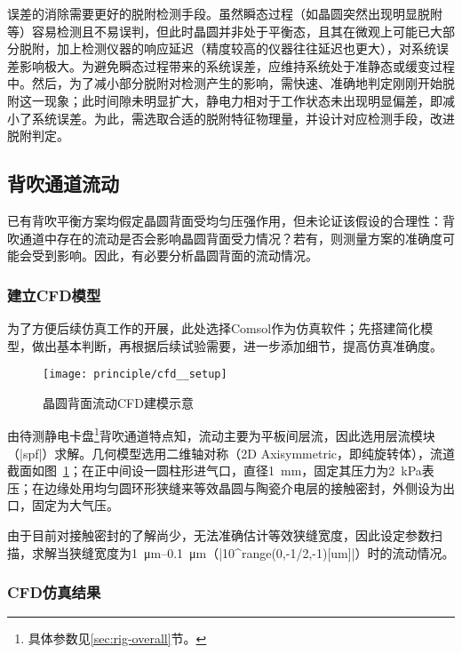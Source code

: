 误差的消除需要更好的脱附检测手段。虽然瞬态过程（如晶圆突然出现明显脱附等）容易检测且不易误判，但此时晶圆并非处于平衡态，且其在微观上可能已大部分脱附，加上检测仪器的响应延迟（精度较高的仪器往往延迟也更大），对系统误差影响极大。为避免瞬态过程带来的系统误差，应维持系统处于准静态或缓变过程中。然后，为了减小部分脱附对检测产生的影响，需快速、准确地判定刚刚开始脱附这一现象；此时间隙未明显扩大，静电力相对于工作状态未出现明显偏差，即减小了系统误差。为此，需选取合适的脱附特征物理量，并设计对应检测手段，改进脱附判定。


\subsection{背吹通道流动}\label{sec:principle-prob-flow}

已有背吹平衡方案均假定晶圆背面受均匀压强作用，但未论证该假设的合理性：背吹通道中存在的流动是否会影响晶圆背面受力情况？若有，则测量方案的准确度可能会受到影响。因此，有必要分析晶圆背面的流动情况。

\subsubsection{建立CFD模型}\label{sec:principle-prob-flow-cfd-setup}

为了方便后续仿真工作的开展，此处选择Comsol作为仿真软件；先搭建简化模型，做出基本判断，再根据后续试验需要，进一步添加细节，提高仿真准确度。

\begin{figure}[tbh]
\centering
\texttt{[image: principle/cfd\_\_setup]}
\caption{晶圆背面流动CFD建模示意}
\label{fig:principle-flow-cfd-setup}
\end{figure}

由待测静电卡盘\footnote{具体参数见\ref{sec:rig-overall}节。}背吹通道特点知，流动主要为平板间层流，因此选用层流模块（\bverb|spf|）求解。几何模型选用二维轴对称（2D Axisymmetric，即纯旋转体），流道截面如图~\ref{fig:principle-flow-cfd-setup}\footnotemark{}；在正中间设一圆柱形进气口，直径\SI{1}{\mm}，固定其压力为\SI{2}{\kPa}表压；在边缘处用均匀圆环形狭缝来等效晶圆与陶瓷介电层的接触密封，外侧设为出口，固定为大气压。


由于目前对接触密封的了解尚少，无法准确估计等效狭缝宽度，因此设定参数扫描，求解当狭缝宽度为\SIrange{1}{0.1}{\um}（\bverb|10^{range(0,-1/2,-1)}[um]|）时的流动情况。

\subsubsection{CFD仿真结果}\label{sec:principle-prob-flow-cfd-result}

